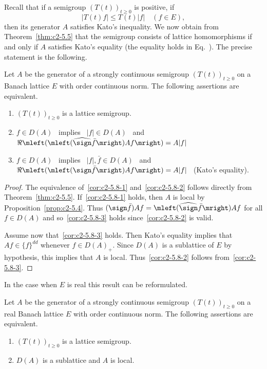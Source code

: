 Recall that if a semigroup $(T(t))_{t \geq 0}$ is positive, \ie if
\begin{equation}\label{eq:c2-5.13}
|T(t)f| \leq T(t) |f| \quad (f \in E) ,
\end{equation}
then its generator $A$ satisfies Kato's inequality. 
We now obtain from Theorem~\ref{thm:c2-5.5} that the semigroup consists of lattice homomorphisms 
 if and only if\/ $A$ satisfies Kato's equality (\ie the equality holds in Eq.~). 
The precise statement is the following.
\begin{corollary}\label{cor:c2-5.8}
Let $A$ be the generator of a strongly continuous semigroup $(T(t))_{t \geq 0}$ on a Banach lattice $E$ with order continuous norm. 
The following assertions are equivalent.
\begin{enumerate}[\upshape (a)]
\item \label{cor:c2-5.8-1}
$(T(t))_{t \geq 0}$ is a lattice semigroup.
\item \label{cor:c2-5.8-2}
$f \in D(A)$ \ implies \ $|f| \in D(A)$ \ and \ $\Re\mleft(\mleft(\widehat{\sign}  \bar{f}\mright)Af\mright) = A|f|$ 
\item \label{cor:c2-5.8-3}
$f \in D(A)$ \ implies \ $|f|,\bar{f} \in D(A)$ \ and \ $\Re\mleft(\mleft(\sign  \bar{f}\mright)Af\mright) = A|f|$ 
\ (Kato's equality).
\end{enumerate}
\end{corollary}
\begin{proof}
The equivalence of~\ref{cor:c2-5.8-1}   and~\ref{cor:c2-5.8-2}   follows directly from Theorem~\ref{thm:c2-5.5}. 
If~\ref{cor:c2-5.8-1}   holds, then $A$ is local by  Proposition~\ref{prop:c2-5.4}.
Thus $(\sign  \bar{f})Af = \mleft(\widehat{\sign}  \bar{f}\mright)Af$ for all $f \in D(A)$ and so~\ref{cor:c2-5.8-3}   holds since~\ref{cor:c2-5.8-2}   is valid.

Assume now that~\ref{cor:c2-5.8-3}   holds. 
Then Kato's equality implies that $Af \in \{f\}^{dd}$ whenever $f \in D(A)_{+}$. 
Since $D(A)$ is a sublattice of\/ $E$ by hypothesis, this implies that $A$ is local. 
Thus~\ref{cor:c2-5.8-2}   follows from~\ref{cor:c2-5.8-3}.
\end{proof}
In the case when $E$ is real this result can be reformulated.
\begin{corollary}\label{cor:c2-5.9}
%
Let $A$ be the generator of a strongly continuous semigroup $(T(t))_{t \geq 0}$ on a real Banach lattice $E$ with order continuous norm. 
The following assertions are equivalent.
\begin{enumerate}[\upshape (a)]
\item \label{cor:c2-5.9-1}
$(T(t))_{t \geq 0}$ is a lattice semigroup.
\item \label{cor:c2-5.9-2}
$D(A)$ is a sublattice and $A$ is local.
\end{enumerate}
\end{corollary}
